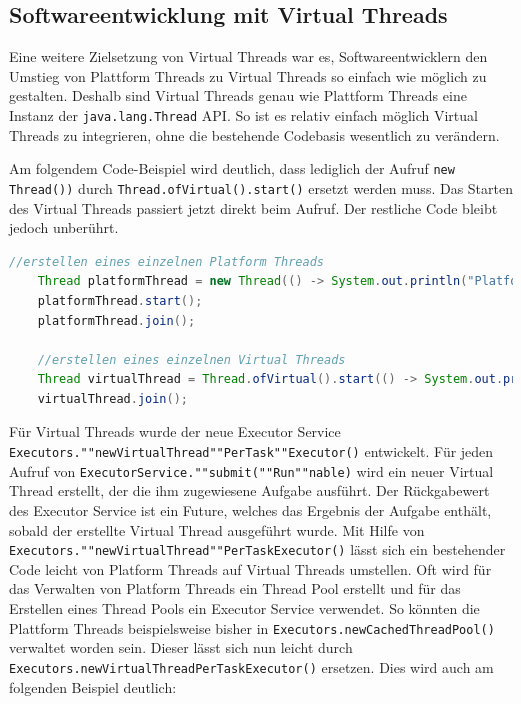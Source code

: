 \documentclass[fontsize=12pt,paper=a4,twoside=semi,parskip=half-,headsepline,headinclude]{scrreprt}
\newcommand{\code}[1]{\texttt{#1}}
\begin{document}
\subsection{Softwareentwicklung mit Virtual Threads}

Eine weitere Zielsetzung von Virtual Threads war es, Softwareentwicklern den Umstieg von Plattform Threads zu Virtual Threads so einfach wie möglich zu gestalten. Deshalb sind Virtual Threads genau wie Plattform Threads eine Instanz der \code{java.lang.Thread} API. So ist es relativ einfach möglich Virtual Threads zu integrieren, ohne die bestehende Codebasis wesentlich zu verändern.

Am folgendem Code-Beispiel wird deutlich, dass lediglich der Aufruf \code{new Thread())} durch \code{Thread.ofVirtual().start()} ersetzt werden muss. Das Starten des Virtual Threads passiert jetzt direkt beim Aufruf. Der restliche Code bleibt jedoch unberührt.

\begin{lstlisting}[language=Java]
	//erstellen eines einzelnen Platform Threads	
	Thread platformThread = new Thread(() -> System.out.println("Platform Thread"));
	platformThread.start();
	platformThread.join();

	//erstellen eines einzelnen Virtual Threads
	Thread virtualThread = Thread.ofVirtual().start(() -> System.out.println("Virtual Thread"));
	virtualThread.join();
\end{lstlisting}

Für Virtual Threads wurde der neue Executor Service \code{Executors.""newVirtualThread""PerTask""Executor()} entwickelt. Für jeden Aufruf von \texttt{ExecutorService.""submit(""Run""nable)} wird ein neuer Virtual Thread erstellt, der die ihm zugewiesene Aufgabe ausführt. Der Rückgabewert des Executor Service ist ein Future, welches das Ergebnis der Aufgabe enthält, sobald der erstellte Virtual Thread ausgeführt wurde. Mit Hilfe von \code{Executors.""newVirtualThread""PerTaskExecutor()} lässt sich ein bestehender Code leicht von Platform Threads auf Virtual Threads umstellen. Oft wird für das Verwalten von Platform Threads ein Thread Pool erstellt und für das Erstellen eines Thread Pools ein Executor Service verwendet. So könnten die Plattform Threads beispielsweise bisher in \code{Executors.newCachedThreadPool()} verwaltet worden sein. Dieser lässt sich nun leicht durch \code{Executors.newVirtualThreadPerTaskExecutor()} ersetzen. Dies wird auch am folgenden Beispiel deutlich:
\end{document}

